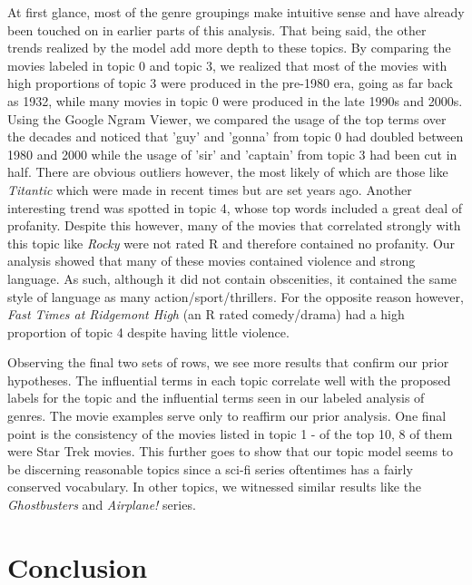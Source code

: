 \documentclass{article} %
\begin{document}
At first glance, most of the genre groupings make intuitive sense and have already been touched on in earlier parts of this analysis. That being said, the other trends realized by the model add more depth to these topics. By comparing the movies labeled in topic 0 and topic 3, we realized that most of the movies with high proportions of topic 3 were produced in the pre-1980 era, going as far back as 1932, while many movies in topic 0 were produced in the late 1990s and 2000s. Using the Google Ngram Viewer, we compared the usage of the top terms over the decades and noticed that 'guy' and 'gonna' from topic 0 had doubled between 1980 and 2000 while the usage of 'sir' and 'captain' from topic 3 had been cut in half. There are obvious outliers however, the most likely of which are those like \textit{Titantic} which were made in recent times but are set years ago. Another interesting trend was spotted in topic 4, whose top words included a great deal of profanity. Despite this however, many of the movies that correlated strongly with this topic like \textit{Rocky} were not rated R and therefore contained no profanity. Our analysis showed that many of these movies contained violence and strong language. As such, although it did not contain obscenities, it contained the same style of language as many action/sport/thrillers. For the opposite reason however, \textit{Fast Times at Ridgemont High} (an R rated comedy/drama) had a high proportion of topic 4 despite having little violence.
 
Observing the final two sets of rows, we see more results that confirm our prior hypotheses. The influential terms in each topic correlate well with the proposed labels for the topic and the influential terms seen in our labeled analysis of genres. The movie examples serve only to reaffirm our prior analysis. One final point is the consistency of the movies listed in topic 1 - of the top 10, 8 of them were Star Trek movies. This further goes to show that our topic model seems to be discerning reasonable topics since a sci-fi series oftentimes has a fairly conserved vocabulary. In other topics, we witnessed similar results like the \textit{Ghostbusters} and \textit{Airplane!} series.

\section{Conclusion}
\end{document}
